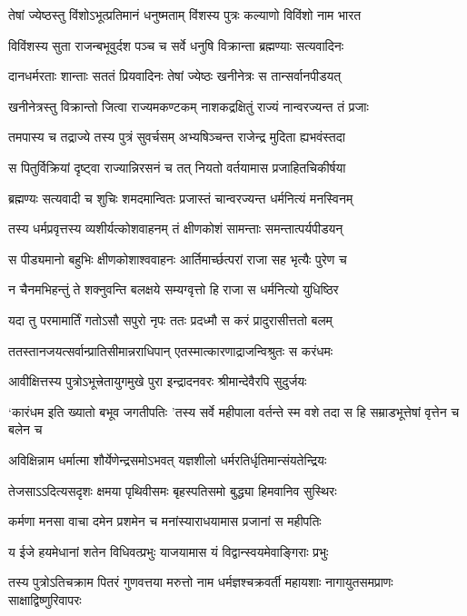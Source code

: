 \twolineshloka
{तेषां ज्येष्ठस्तु विंशोऽभूत्प्रतिमानं धनुष्मताम्}
{विंशस्य पुत्रः कल्याणो विविंशो नाम भारत}


\twolineshloka
{विविंशस्य सुता राजन्बभूवुर्दश पञ्च च}
{सर्वे धनुषि विक्रान्ता ब्रह्मण्याः सत्यवादिनः}


\twolineshloka
{दानधर्मरताः शान्ताः सततं प्रियवादिनः}
{तेषां ज्येष्ठः खनीनेत्रः स तान्सर्वानपीडयत्}


\twolineshloka
{खनीनेत्रस्तु विक्रान्तो जित्वा राज्यमकण्टकम्}
{नाशकद्रक्षितुं राज्यं नान्वरज्यन्त तं प्रजाः}


\twolineshloka
{तमपास्य च तद्राज्ये तस्य पुत्रं सुवर्चसम्}
{अभ्यषिञ्चन्त राजेन्द्र मुदिता ह्यभवंस्तदा}


\twolineshloka
{स पितुर्विक्रियां दृष्ट्वा राज्यान्निरसनं च तत्}
{नियतो वर्तयामास प्रजाहितचिकीर्षया}


\twolineshloka
{ब्रह्मण्यः सत्यवादी च शुचिः शमदमान्वितः}
{प्रजास्तं चान्वरज्यन्त धर्मनित्यं मनस्विनम्}


\twolineshloka
{तस्य धर्मप्रवृत्तस्य व्यशीर्यत्कोशवाहनम्}
{तं क्षीणकोशं सामन्ताः समन्तात्पर्यपीडयन्}


\twolineshloka
{स पीड्यमानो बहुभिः क्षीणकोशाश्ववाहनः}
{आर्तिमार्च्छत्परां राजा सह भृत्यैः पुरेण च}


\twolineshloka
{न चैनमभिहन्तुं ते शक्नुवन्ति बलक्षये}
{सम्यग्वृत्तो हि राजा स धर्मनित्यो युधिष्ठिर}


\twolineshloka
{यदा तु परमामार्तिं गतोऽसौ सपुरो नृपः}
{ततः प्रदध्मौ स करं प्रादुरासीत्ततो बलम्}


\twolineshloka
{ततस्तानजयत्सर्वान्प्रातिसीमान्नराधिपान्}
{एतस्मात्कारणाद्राजन्विश्रुतः स करंधमः}


\twolineshloka
{आवीक्षित्तस्य पुत्रोऽभूत्त्रेतायुगमुखे पुरा}
{इन्द्रादनवरः श्रीमान्देवैरपि सुदुर्जयः}


\threelineshloka
{`कारंधम इति ख्यातो बभूव जगतीपतिः}
{'तस्य सर्वे महीपाला वर्तन्ते स्म वशे तदा}
{स हि सम्राडभूत्तेषां वृत्तेन च बलेन च}


\twolineshloka
{अविक्षिन्नाम धर्मात्मा शौर्येणेन्द्रसमोऽभवत्}
{यज्ञशीलो धर्मरतिर्धृतिमान्संयतेन्द्रियः}


\twolineshloka
{तेजसाऽऽदित्यसदृशः क्षमया पृथिवीसमः}
{बृहस्पतिसमो बुद्ध्या हिमवानिव सुस्थिरः}


\twolineshloka
{कर्मणा मनसा वाचा दमेन प्रशमेन च}
{मनांस्याराधयामास प्रजानां स महीपतिः}


\twolineshloka
{य ईजे हयमेधानां शतेन विधिवत्प्रभुः}
{याजयामास यं विद्वान्स्वयमेवाङ्गिराः प्रभुः}


\threelineshloka
{तस्य पुत्रोऽतिचक्राम पितरं गुणवत्तया}
{मरुत्तो नाम धर्मज्ञश्चक्रवर्ती महायशाः}
{नागायुतसमप्राणः साक्षाद्विष्णुरिवापरः}


